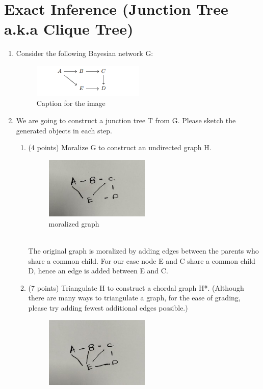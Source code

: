 \documentclass[a3paper,12pt]{extarticle} %
\begin{document}
\section{Exact Inference (Junction Tree a.k.a Clique Tree)}
\begin{enumerate}
    \item Consider the following Bayesian network G:
    \begin{figure}[h!]
        \centering
        \includegraphics[width=0.5\textwidth]{junction_tree.png}
        \caption{Caption for the image}
        \label{fig:example_image}
    \end{figure}
    \item We are going to construct a junction tree T from G. Please sketch the generated objects in each step.
    \begin{enumerate}
        \item (4 points) Moralize G to construct an undirected graph H.
        \begin{figure}[h!]
            \centering
            \includegraphics[width=0.5\textwidth]{moralized.jpg}
            \caption{moralized graph}
            \label{fig:example_image}
        \end{figure}
        \\The original graph is moralized by adding edges between the parents who share a common child. For our case node E and C share a common child D, hence an edge is added between E and C.
        \item (7 points) Triangulate H to construct a chordal graph H*.
        (Although there are many ways to triangulate a graph, for the ease of grading, please try adding fewest
        additional edges possible.)
        \begin{figure}[h!]
            \centering
            \includegraphics[width=0.5\textwidth]{triangulated.jpg}

\end{figure}
\end{enumerate}
\end{enumerate}
\end{document}
